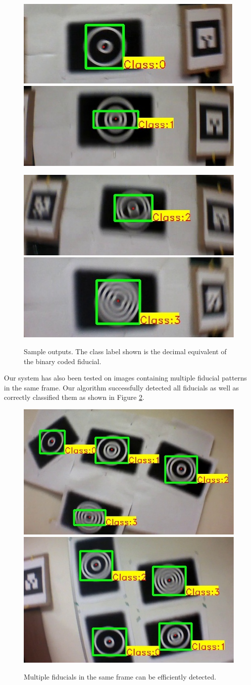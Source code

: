 \documentclass[10pt,twocolumn,letterpaper]{article}
\begin{document}
\begin{figure}[h!]
\centering
  \includegraphics[width=0.4\linewidth]{images/output_00.jpg}
  \includegraphics[width=0.4\linewidth]{images/output_01.jpg}

  \includegraphics[width=0.4\linewidth]{images/output_10.jpg}
  \includegraphics[width=0.4\linewidth]{images/output_11.jpg}
  \caption{Sample outputs. The class label shown is the decimal equivalent
  of the binary coded fiducial.}
  \label{fig:out_outputs}
\end{figure}

Our system has also been tested on images containing multiple fiducial
patterns in the same frame. Our algorithm successfully detected
all fiducials as well as correctly classified them as shown in
Figure \ref{fig:output_all}.

\begin{figure}[ht!]
\centering
  \includegraphics[width=.45\linewidth]{images/output_all_2.jpg}
  \includegraphics[width=.45\linewidth]{images/new_results/output_test_all1.jpg}
  \caption{Multiple fiducials in the same frame can be efficiently
    detected. }
  \label{fig:output_all}
\end{figure}
\end{document}
